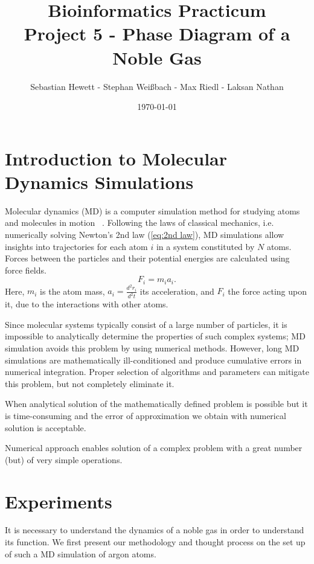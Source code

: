 \documentclass[10pt, a4paper, oneside, twocolumn]{article}
\title{Bioinformatics Practicum\\\textbf{Project 5 - Phase Diagram of a Noble Gas}}
\author{Sebastian Hewett - Stephan Weißbach - Max Riedl - Laksan Nathan}
\date{\today}
\begin{document}
\maketitle

\section{Introduction to Molecular Dynamics Simulations}

Molecular dynamics (MD) is a computer simulation method for studying atoms and molecules in motion ~\cite{Gonzalez}. Following the laws of classical mechanics, i.e. numerically solving Newton's 2nd law (\ref{eq:2nd law}), MD simulations allow insights into trajectories for each atom \(i\) in a system constituted by \(N\) atoms. Forces between the particles and their potential energies are calculated using force fields.
\begin{equation}\label{eq:2nd law}
F_i = m_i a_i.
\end{equation} %
Here, \(m_i\) is the atom mass, \(a_i = \frac{d^{2}r_i}{d^{2}t}\) its acceleration, and \(F_i\) the force acting upon it, due to the interactions with other atoms.

Since molecular systems typically consist of a large number of particles, it is impossible to analytically determine the properties of such complex systems; MD simulation avoids this problem by using numerical methods. However, long MD simulations are mathematically ill-conditioned and produce cumulative errors in numerical integration. Proper selection of algorithms and parameters can mitigate this problem, but not completely eliminate it.

When analytical solution of the mathematically defined problem is possible but it is time-consuming and the error of approximation we obtain with numerical solution is acceptable.

Numerical approach enables solution of a complex problem with a great number (but) of very simple operations.

\section{Experiments}

It is necessary to understand the dynamics of a noble gas in order to understand its function. We first present our methodology and thought process on the set up of such a MD simulation of argon atoms.
\end{document}
